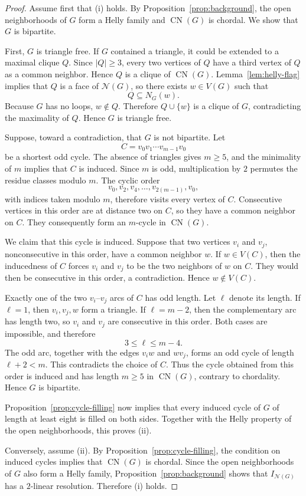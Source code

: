 \documentclass[11pt]{amsart}
\theoremstyle{definition}
\theoremstyle{remark}
\numberwithin{equation}{section}
\newcommand{\NN}{\mathcal N}
\newcommand{\CN}{\operatorname{CN}}
\begin{document}
	\begin{proof}
		Assume first that \textup{(i)} holds. By
		Proposition~\ref{prop:background}, the open neighborhoods of \(G\) form a
		Helly family and \(\CN(G)\) is chordal. We show that \(G\) is bipartite.
		
		First, \(G\) is triangle free. If \(G\) contained a triangle, it could be
		extended to a maximal clique \(Q\). Since \(|Q|\ge3\), every two vertices
		of \(Q\) have a third vertex of \(Q\) as a common neighbor. Hence \(Q\) is a
		clique of \(\CN(G)\). Lemma~\ref{lem:helly-flag} implies that \(Q\) is a face
		of \(\NN(G)\), so there exists \(w\in V(G)\) such that
		\[
		Q\subseteq N_G(w).
		\]
		Because \(G\) has no loops, \(w\notin Q\). Therefore \(Q\cup\{w\}\) is a
		clique of \(G\), contradicting the maximality of \(Q\). Hence \(G\) is triangle free.
		
		Suppose, toward a contradiction, that \(G\) is not bipartite. Let
		\[
		C=v_0v_1\cdots v_{m-1}v_0
		\]
		be a shortest odd cycle.
		The absence of triangles gives \(m\ge5\), and the minimality of \(m\)
		implies that \(C\) is induced. Since \(m\) is odd, multiplication by \(2\)
		permutes the residue classes modulo \(m\). The cyclic order
		\[
		v_0,v_2,v_4,\ldots,v_{2(m-1)},v_0,
		\]
		with indices taken modulo \(m\), therefore visits every vertex of \(C\).
		Consecutive vertices in this order are at distance two on \(C\), so they
		have a common neighbor on \(C\). They consequently form an \(m\)-cycle in
		\(\CN(G)\).
		
		We claim that this cycle is induced. Suppose that two vertices \(v_i\) and
		\(v_j\), nonconsecutive in this order, have a common neighbor
		\(w\). If \(w\in V(C)\), then the inducedness of \(C\) forces \(v_i\) and
		\(v_j\) to be the two neighbors of \(w\) on \(C\). They would then be
		consecutive in this order, a contradiction. Hence
		\(w\notin V(C)\).
		
		Exactly one of the two \(v_i\)--\(v_j\) arcs of \(C\) has odd length. Let
		\(\ell\) denote its length. If \(\ell=1\), then \(v_i,v_j,w\) form a triangle.
		If \(\ell=m-2\), then the complementary arc has length two, so \(v_i\) and
		\(v_j\) are consecutive in this order. Both cases are impossible,
		and therefore
		\[
		3\le\ell\le m-4.
		\]
		The odd arc, together with the edges \(v_iw\) and \(wv_j\), forms an odd
		cycle of length \(\ell+2<m\). This contradicts the choice of \(C\). Thus the
		cycle obtained from this order is induced and has length \(m\ge5\) in
		\(\CN(G)\),
		contrary to chordality. Hence \(G\) is bipartite.
		
		Proposition~\ref{prop:cycle-filling} now implies that every induced cycle of
		\(G\) of length at least eight is filled on both sides. Together with the
		Helly property of the open neighborhoods, this proves
		\textup{(ii)}.
		
		Conversely, assume \textup{(ii)}. By Proposition~\ref{prop:cycle-filling},
		the condition on induced cycles implies that \(\CN(G)\) is chordal. Since
		the open neighborhoods of \(G\) also form a Helly family,
		Proposition~\ref{prop:background} shows that \(I_{\NN(G)}\) has a \(2\)-linear resolution. Therefore
		\textup{(i)} holds.
	\end{proof}
	
\end{document}
